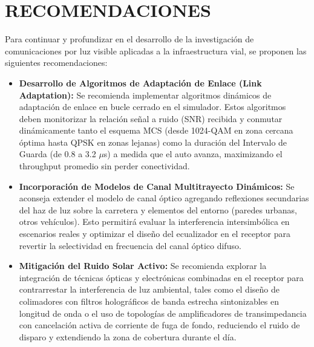 \section{RECOMENDACIONES}

Para continuar y profundizar en el desarrollo de la investigación de comunicaciones por luz visible aplicadas a la infraestructura vial, se proponen las siguientes recomendaciones:

\begin{itemize}
    \item \textbf{Desarrollo de Algoritmos de Adaptación de Enlace (Link Adaptation):}
    Se recomienda implementar algoritmos dinámicos de adaptación de enlace en bucle cerrado en el simulador. Estos algoritmos deben monitorizar la relación señal a ruido (SNR) recibida y conmutar dinámicamente tanto el esquema MCS (desde 1024-QAM en zona cercana óptima hasta QPSK en zonas lejanas) como la duración del Intervalo de Guarda (de 0.8 a 3.2 $\mu$s) a medida que el auto avanza, maximizando el throughput promedio sin perder conectividad.
    
    \item \textbf{Incorporación de Modelos de Canal Multitrayecto Dinámicos:}
    Se aconseja extender el modelo de canal óptico agregando reflexiones secundarias del haz de luz sobre la carretera y elementos del entorno (paredes urbanas, otros vehículos). Esto permitirá evaluar la interferencia intersimbólica en escenarios reales y optimizar el diseño del ecualizador en el receptor para revertir la selectividad en frecuencia del canal óptico difuso.
    
    \item \textbf{Mitigación del Ruido Solar Activo:}
    Se recomienda explorar la integración de técnicas ópticas y electrónicas combinadas en el receptor para contrarrestar la interferencia de luz ambiental, tales como el diseño de colimadores con filtros holográficos de banda estrecha sintonizables en longitud de onda o el uso de topologías de amplificadores de transimpedancia con cancelación activa de corriente de fuga de fondo, reduciendo el ruido de disparo y extendiendo la zona de cobertura durante el día.
\end{itemize}
